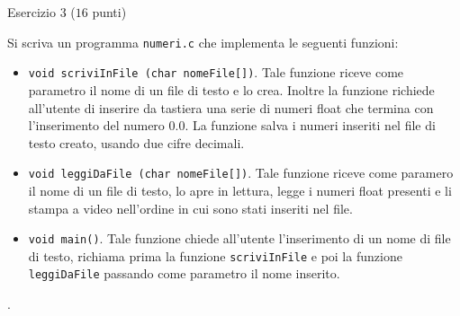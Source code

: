 \documentclass[12pt]{article}
\begin{document}
\vspace*{1ex}
\begin{center}{\Large Esercizio 3} ($16$ punti)\end{center}
Si scriva un programma \texttt{numeri.c} che implementa le seguenti funzioni:
\begin{itemize}
	\item \texttt{void scriviInFile (char nomeFile[])}. Tale funzione riceve come parametro il nome di un file di testo e lo crea. Inoltre la funzione richiede all'utente di inserire da tastiera una serie di numeri float che termina con l'inserimento del numero 0.0. La funzione salva i numeri inseriti nel file di testo creato, usando due cifre decimali.
	\item \texttt{void leggiDaFile (char nomeFile[])}. Tale funzione riceve come paramero il nome di un file di testo, lo apre in lettura, legge i numeri float presenti e li stampa a video nell'ordine in cui sono stati inseriti nel file.
	\item \texttt{void main()}. Tale funzione chiede all'utente l'inserimento di un nome di file di testo, richiama prima la funzione \texttt{scriviInFile} e poi la funzione \texttt{leggiDaFile} passando come parametro il nome inserito.
\end{itemize}.
\end{document}
